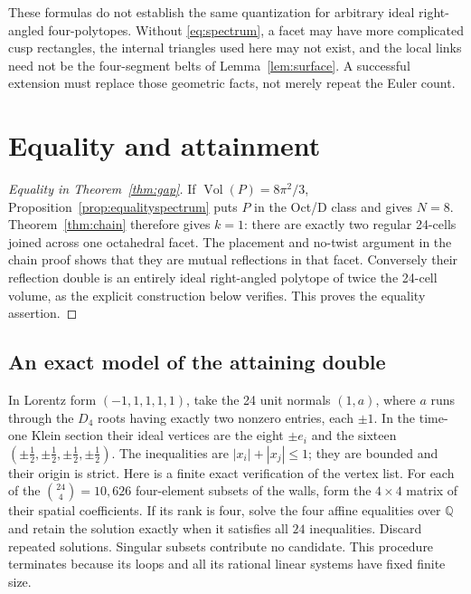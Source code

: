 \documentclass[11pt]{article}
\theoremstyle{remark}
\newcommand{\Vol}{\operatorname{Vol}}
\begin{document}
These formulas do not establish the same quantization for arbitrary
ideal right-angled four-polytopes. Without
\eqref{eq:spectrum}, a facet may have more complicated cusp
rectangles, the internal triangles used here may not exist, and
the local links need not be the four-segment belts of
Lemma~\ref{lem:surface}. A successful extension must replace those
geometric facts, not merely repeat the Euler count.

\section{Equality and attainment}\label{sec:attainment}
\begin{proof}[Equality in Theorem~\ref{thm:gap}]
If $\Vol(P)=8\pi^2/3$, Proposition~\ref{prop:equalityspectrum}
puts $P$ in the Oct/D class and gives $N=8$. Theorem~\ref{thm:chain}
therefore gives $k=1$: there are exactly two regular 24-cells joined
across one octahedral facet. The placement and no-twist argument in
the chain proof shows that they are mutual reflections in that
facet. Conversely their reflection double is an entirely ideal
right-angled polytope of twice the 24-cell volume, as the explicit
construction below verifies. This proves the equality assertion.
\end{proof}

\subsection{An exact model of the attaining double}

In Lorentz form $(-1,1,1,1,1)$, take the 24 unit normals $(1,a)$,
where $a$ runs through the $D_4$ roots having exactly two nonzero
entries, each $\pm1$. In the time-one Klein section their ideal
vertices are the eight $\pm e_i$ and the sixteen
$(\pm\tfrac12,\pm\tfrac12,\pm\tfrac12,\pm\tfrac12)$.
The inequalities are $|x_i|+|x_j|\le1$; they are bounded and their
origin is strict. Here is a finite exact verification of the vertex list. For each of
the $\binom{24}{4}=10,626$ four-element subsets of the walls, form
the $4\times4$ matrix of their spatial coefficients. If its rank is
four, solve the four affine equalities over $\mathbb Q$ and retain
the solution exactly when it satisfies all $24$ inequalities.
Discard repeated solutions. Singular subsets contribute no candidate.
This procedure terminates because its loops and all its rational
linear systems have fixed finite size.
\end{document}
